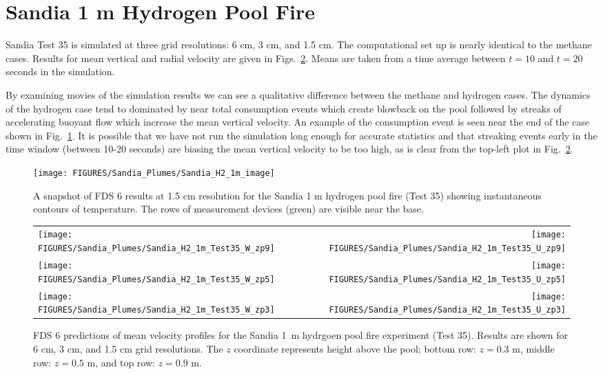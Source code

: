 \clearpage

\section{Sandia 1 m Hydrogen Pool Fire}
\label{Sandia_hydrogen}

Sandia Test 35 \cite{Tieszen:2004} is simulated at three grid resolutions: 6 cm, 3 cm, and 1.5 cm.  The computational set up is nearly identical to the methane cases.  Results for mean vertical and radial velocity are given in Figs.~\ref{Sandia_H2_1m_Test35_velocity}.  Means are taken from a time average between $t=10$ and $t=20$ seconds in the simulation.

By examining movies of the simulation results we can see a qualitative difference between the methane and hydrogen cases.  The dynamics of the hydrogen case tend to dominated by near total consumption events which create blowback on the pool followed by streaks of accelerating buoyant flow which increase the mean vertical velocity.  An example of the consumption event is seen near the end of the case shown in Fig.~\ref{Sandia_H2_1m_image}.  It is possible that we have not run the simulation long enough for accurate statistics and that streaking events early in the time window (between 10-20 seconds) are biasing the mean vertical velocity to be too high, as is clear from the top-left plot in Fig.~\ref{Sandia_H2_1m_Test35_velocity}.

\begin{figure}[h]
\begin{center}
\texttt{[image: FIGURES/Sandia\_Plumes/Sandia\_H2\_1m\_image]}
\caption[Sandia 1~m hydrogen pool fire instantaneous temperature contours.]{A snapshot of FDS 6 results at 1.5 cm resolution for the Sandia 1 m hydrogen pool fire (Test 35) showing instantaneous contours of temperature.  The rows of measurement devices (green) are visible near the base.}
\label{Sandia_H2_1m_image}
\end{center}
\end{figure}

\begin{figure}[p]
\begin{tabular*}{\textwidth}{l@{\extracolsep{\fill}}r}
\texttt{[image: FIGURES/Sandia\_Plumes/Sandia\_H2\_1m\_Test35\_W\_zp9]} &
\texttt{[image: FIGURES/Sandia\_Plumes/Sandia\_H2\_1m\_Test35\_U\_zp9]} \\
\texttt{[image: FIGURES/Sandia\_Plumes/Sandia\_H2\_1m\_Test35\_W\_zp5]} &
\texttt{[image: FIGURES/Sandia\_Plumes/Sandia\_H2\_1m\_Test35\_U\_zp5]} \\
\texttt{[image: FIGURES/Sandia\_Plumes/Sandia\_H2\_1m\_Test35\_W\_zp3]} &
\texttt{[image: FIGURES/Sandia\_Plumes/Sandia\_H2\_1m\_Test35\_U\_zp3]}
\end{tabular*}
\caption[Sandia 1~m hydrogen pool fire (Test 35) mean velocity profiles.]
{FDS 6 predictions of mean velocity profiles for the Sandia 1~m hydrgoen pool fire experiment (Test 35). Results are shown for 6 cm, 3 cm, and 1.5 cm grid resolutions. The $z$ coordinate represents height above the pool; bottom row: $z=0.3$ m, middle row: $z=0.5$ m, and top row: $z=0.9$ m.}
\label{Sandia_H2_1m_Test35_velocity}
\end{figure}

\clearpage
